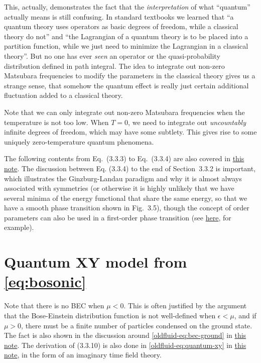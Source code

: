 \documentclass[hyperref, a4paper]{article}
\newcommand{\oldfluid}{\href{fluid.pdf}{this note}}
\begin{document}
This, actually, demonstrates the fact that the \emph{interpretation} of what ``quantum'' actually means 
is still confusing. In standard textbooks we learned that ``a quantum theory uses operators as basic 
degrees of freedom, while a classical theory do not'' and ``the Lagrangian of a quantum theory is to 
be placed into a partition function, while we just need to minimize the Lagrangian in a classical theory''.
But no one has ever \emph{seen} an operator or the quasi-probability distribution defined in path integral.
The idea to integrate out non-zero Matsubara frequencies to modify the parameters in the classical theory 
gives us a strange sense, that somehow the quantum effect is really just certain additional fluctuation
added to a classical theory. 

Note that we can only integrate out non-zero Matsubara frequencies when the temperature is not too low. 
When $T=0$, we need to integrate out \emph{uncountably} infinite degrees of freedom, 
which may have some subtlety. This gives rise to some uniquely zero-temperature quantum phenomena. 

The following contents from Eq.~(3.3.3) to Eq.~(3.3.4) are also covered in \oldfluid. 
The discussion between Eq. (3.3.4) to the end of Section~3.3.2 is important, which illustrates the 
Ginzburg-Landau paradigm and why it is almost always associated with symmetries (or otherwise it is 
highly unlikely that we have several minima of the energy functional that share the same energy, so 
that we have a smooth phase transition shown in Fig.~3.5), though the concept of order parameters 
can also be used in a first-order phase transition (see \href{../quasicrystal-fd/main.pdf}{here}, 
for example).  

\section{Quantum XY model from \eqref{eq:bosonic}}\label{sec:quantum-xy}

Note that there is no BEC when $\mu < 0$.  
This is often justified by the argument that the 
Bose-Einstein distribution function is not well-defined when $\epsilon < \mu$, and if $\mu > 0$,
there must be a finite number of particles condensed on the ground state. The fact is also shown 
in the discussion around \eqref{oldfluid-eq:bec-ground} in \oldfluid.
The derivation of (3.3.10) is also done in \eqref{oldfluid-eq:quantum-xy} in \oldfluid, in the form 
of an imaginary time field theory. 
\end{document}
